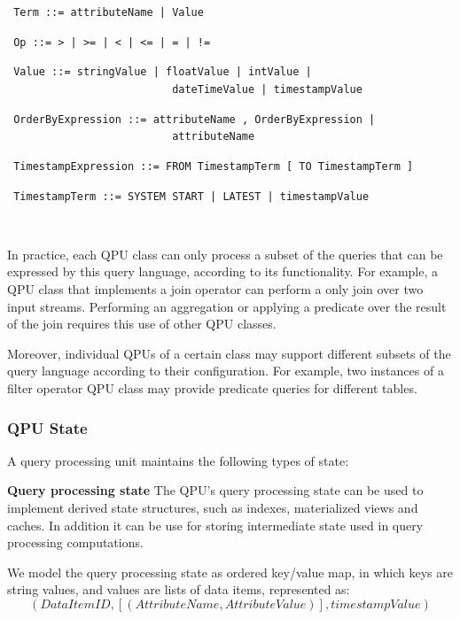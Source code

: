 {\obeylines\obeyspaces
\texttt{
Term                  ::=  attributeName | Value
}}

{\obeylines\obeyspaces
\texttt{
Op                    ::= > | >= | < | <= | = | !=
}}

{\obeylines\obeyspaces
\texttt{
Value                 ::= stringValue | floatValue | intValue |
~~~~~~~~~~~~~~~~~~~~~~~~~~dateTimeValue | timestampValue
}}

{\obeylines\obeyspaces
\texttt{
OrderByExpression     ::= attributeName , OrderByExpression |
~~~~~~~~~~~~~~~~~~~~~~~~~~attributeName
}}

{\obeylines\obeyspaces
\texttt{
TimestampExpression   ::= FROM TimestampTerm [ TO TimestampTerm ]
}}

{\obeylines\obeyspaces
\texttt{
TimestampTerm         ::= SYSTEM START | LATEST | timestampValue
}}

~ \bigskip

In practice, each QPU class can only process a subset of the queries that can be expressed by this query language,
according to its functionality.
For example, a QPU class that implements a join operator can perform a only join over two input streams.
Performing an aggregation or applying a predicate over the result of the join requires this use of other QPU classes.


Moreover, individual QPUs of a certain class may support different subsets of the query language according to their
configuration.
For example, two instances of a filter operator QPU class may provide predicate queries for different tables.


\subsubsection{QPU State}

A query processing unit maintains the following types of state:

\medskip
\noindent
\textbf{Query processing state}
The QPU's query processing state can be used to implement derived state structures, such as indexes, materialized views and
caches.
In addition it can be use for storing intermediate state used in query processing computations.

We model the query processing state as ordered key/value map, in which keys are string values, and values are lists of
data items, represented as:
\[
  (DataItemID, [(AttributeName, AttributeValue)], timestampValue)
\]

